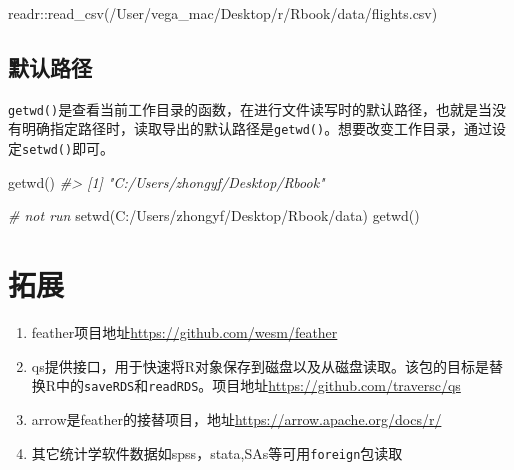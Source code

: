 \documentclass[
]{book}
\newenvironment{Shaded}{\begin{snugshade}}{\end{snugshade}}
\newcommand{\CommentTok}[1]{\textcolor[rgb]{0.56,0.35,0.01}{\textit{#1}}}
\newcommand{\FunctionTok}[1]{\textcolor[rgb]{0.00,0.00,0.00}{#1}}
\newcommand{\NormalTok}[1]{#1}
\newcommand{\SpecialCharTok}[1]{\textcolor[rgb]{0.00,0.00,0.00}{#1}}
\newcommand{\StringTok}[1]{\textcolor[rgb]{0.31,0.60,0.02}{#1}}
\begin{document}
\begin{Shaded}
\begin{Highlighting}[]
\NormalTok{readr}\SpecialCharTok{::}\FunctionTok{read\_csv}\NormalTok{(}\StringTok{\textquotesingle{}/User/vega\_mac/Desktop/r/Rbook/data/flights.csv\textquotesingle{}}\NormalTok{)}
\end{Highlighting}
\end{Shaded}

\hypertarget{ux9ed8ux8ba4ux8defux5f84}{%
\subsection{默认路径}\label{ux9ed8ux8ba4ux8defux5f84}}

\texttt{getwd()}是查看当前工作目录的函数，在进行文件读写时的默认路径，也就是当没有明确指定路径时，读取导出的默认路径是\texttt{getwd()}。想要改变工作目录，通过设定\texttt{setwd()}即可。

\begin{Shaded}
\begin{Highlighting}[]
\FunctionTok{getwd}\NormalTok{()}
\CommentTok{\#\textgreater{} [1] "C:/Users/zhongyf/Desktop/Rbook"}
\end{Highlighting}
\end{Shaded}

\begin{Shaded}
\begin{Highlighting}[]
\CommentTok{\# not run}
\FunctionTok{setwd}\NormalTok{(}\StringTok{\textquotesingle{}C:/Users/zhongyf/Desktop/Rbook/data\textquotesingle{}}\NormalTok{)}
\FunctionTok{getwd}\NormalTok{()}
\end{Highlighting}
\end{Shaded}

\hypertarget{data:expand}{%
\section{拓展}\label{data:expand}}

\begin{enumerate}
\def\labelenumi{\arabic{enumi}.}
\item
  feather项目地址\url{https://github.com/wesm/feather}
\item
  qs提供接口，用于快速将R对象保存到磁盘以及从磁盘读取。该包的目标是替换R中的\texttt{saveRDS}和\texttt{readRDS}。项目地址\url{https://github.com/traversc/qs}
\item
  arrow是feather的接替项目，地址\url{https://arrow.apache.org/docs/r/}
\item
  其它统计学软件数据如spss，stata,SAs等可用\texttt{foreign}包读取
\end{enumerate}
\end{document}
